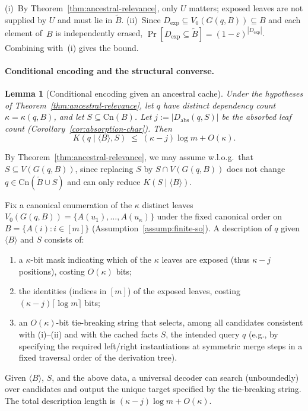 \documentclass[journal]{IEEEtran}
\makeatletter
\newcommand{\Cn}{\text{Cn}}
\newtheorem{lemma}{Lemma}[section]
\numberwithin{equation}{section}
\renewenvironment{proof}[1][\proofname]{\par
  \pushQED{\qed}%
  \normalfont \topsep6\p@\@plus6\p@\relax
  \trivlist
  \item[\hskip\labelsep
        \itshape
    #1\@addpunct{.}]\ignorespaces
}{%
  \popQED\endtrivlist\@endpefalse
}
\makeatother
\begin{document}
\begin{proof}
(i)~By Theorem~\ref{thm:ancestral-relevance}, only $U$ matters;
exposed leaves are not supplied by $U$ and must lie in
$\tilde B$.
(ii)~Since $D_{\mathrm{exp}}\subseteq V_0(G(q,B))\subseteq B$
and each element of~$B$ is independently erased,
$\Pr[D_{\mathrm{exp}}\subseteq\tilde B]
=(1{-}\varepsilon)^{|D_{\mathrm{exp}}|}$.
Combining with~(i) gives the bound.
\end{proof}

\paragraph{Conditional encoding and the structural converse.}

\begin{lemma}[Conditional encoding given an ancestral cache]
\label{lem:conditional-encoding}
Under the hypotheses of Theorem~\ref{thm:ancestral-relevance}, let \(q\) have
distinct dependency count \(\kappa=\kappa(q,B)\), and let \(S\subseteq\Cn(B)\).
Let \(j:=|D_{\mathrm{abs}}(q,S)|\) be the absorbed leaf count
(Corollary~\ref{cor:absorption-char}).
Then
\[
  K(q\mid\langle B\rangle,S)
  \;\le\;
  (\kappa-j)\log m + O(\kappa).
\]
\end{lemma}

\begin{proof}
By Theorem~\ref{thm:ancestral-relevance}, we may assume w.l.o.g.\ that
\(S\subseteq V(G(q,B))\), since replacing \(S\) by \(S\cap V(G(q,B))\) does not
change \(q\in\Cn(\tilde B\cup S)\) and can only reduce \(K(S\mid\langle B\rangle)\).

Fix a canonical enumeration of the \(\kappa\) distinct leaves
\(V_0(G(q,B))=\{A(u_1),\ldots,A(u_\kappa)\}\) under the fixed canonical order on
\(B=\{A(i):i\in[m]\}\) (Assumption~\ref{assump:finite-so}).
A description of \(q\) given \(\langle B\rangle\) and \(S\) consists of:
\begin{enumerate}[label=\textup{(\roman*)}]
\item a \(\kappa\)-bit mask indicating which of the \(\kappa\) leaves are exposed
(thus \(\kappa-j\) positions), costing \(O(\kappa)\) bits;
\item the identities (indices in \([m]\)) of the exposed leaves, costing
\((\kappa-j)\lceil\log m\rceil\) bits;
\item an \(O(\kappa)\)-bit tie-breaking string that selects, among all candidates
consistent with (i)--(ii) and with the cached facts \(S\), the intended query
\(q\) (e.g., by specifying the required left/right instantiations at symmetric
merge steps in a fixed traversal order of the derivation tree).
\end{enumerate}
Given \(\langle B\rangle\), \(S\), and the above data, a universal decoder can
search (unboundedly) over candidates and output the unique target specified by
the tie-breaking string. The total description length is
\((\kappa-j)\log m+O(\kappa)\).
\end{proof}
\end{document}
